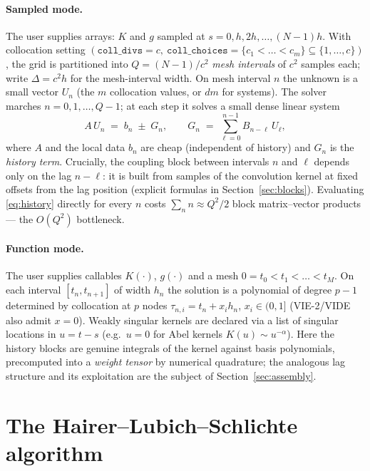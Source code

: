 \documentclass[11pt]{article}
\begin{document}
\paragraph{Sampled mode.} The user supplies arrays: $K$ and $g$ sampled
at $s = 0, h, 2h, \dots, (N-1)h$. With collocation setting
$(\texttt{coll\_divs}=c,\ \texttt{coll\_choices}=\{c_1<\dots<c_m\}
\subseteq\{1,\dots,c\})$, the grid is partitioned into $Q=(N-1)/c^2$
\emph{mesh intervals} of $c^2$ samples each; write $\Delta = c^2 h$ for
the mesh-interval width. On mesh interval $n$ the unknown is a small
vector $U_n$ (the $m$ collocation values, or $dm$ for systems). The
solver marches $n = 0, 1, \dots, Q-1$; at each step it solves a small
dense linear system
\begin{equation}
A\,U_n \;=\; b_n \;\pm\; G_n,
\qquad
G_n \;=\; \sum_{\ell=0}^{n-1} B_{n-\ell}\, U_\ell ,
\label{eq:history}
\end{equation}
where $A$ and the local data $b_n$ are cheap (independent of history)
and $G_n$ is the \emph{history term}. Crucially, the coupling block
between intervals $n$ and $\ell$ depends only on the lag $n-\ell$: it is
built from samples of the convolution kernel at fixed offsets from the
lag position (explicit formulas in Section~\ref{sec:blocks}). Evaluating
\eqref{eq:history} directly for every $n$ costs
$\sum_n n \approx Q^2/2$ block matrix--vector products --- the
$O(Q^2)$ bottleneck.

\paragraph{Function mode.} The user supplies callables $K(\cdot)$,
$g(\cdot)$ and a mesh $0=t_0<t_1<\dots<t_M$. On each interval
$[t_n,t_{n+1}]$ of width $h_n$ the solution is a polynomial of degree
$p-1$ determined by collocation at $p$ nodes
$\tau_{n,i}=t_n+x_i h_n$, $x_i\in(0,1]$ (VIE-2/VIDE also admit $x=0$).
Weakly singular kernels are declared via a list of singular locations in
$u=t-s$ (e.g.\ $u=0$ for Abel kernels $K(u)\sim u^{-\alpha}$). Here the
history blocks are genuine integrals of the kernel against basis
polynomials, precomputed into a \emph{weight tensor} by numerical
quadrature; the analogous lag structure and its exploitation are the
subject of Section~\ref{sec:assembly}.

\section{The Hairer--Lubich--Schlichte algorithm}
\label{sec:algorithm}
\end{document}
